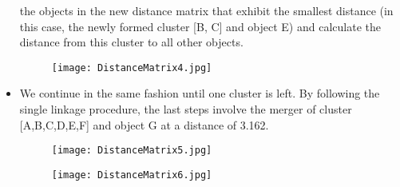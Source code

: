 \documentclass[a4paper,12pt]{article}
\begin{document}
\begin{itemize}
the objects in the new distance matrix that exhibit the smallest distance (in this case,
the newly formed cluster [B, C] and object E) and calculate the distance from this
cluster to all other objects.
\begin{figure}[h!]
\begin{center}
  \texttt{[image: DistanceMatrix4.jpg]}\\
\end{center}
\end{figure}
\item We continue in the same fashion until one cluster is left. By following the single linkage procedure, the last steps involve the merger
of cluster [A,B,C,D,E,F] and object G at a distance of 3.162.
\begin{figure}[h!]
\begin{center}
  \texttt{[image: DistanceMatrix5.jpg]}\\
\end{center}
\end{figure}
\begin{figure}[h!]
\begin{center}
  \texttt{[image: DistanceMatrix6.jpg]}\\
\end{center}
\end{figure}
\end{itemize}
\newpage
\end{document}
